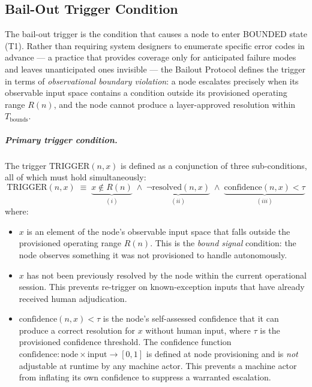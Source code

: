 \subsection{Bail-Out Trigger Condition}\label{sec:bailout-trigger}

The bail-out trigger is the condition that causes a node to enter BOUNDED state (T1). Rather than requiring system designers to enumerate specific error codes in advance — a practice that provides coverage only for anticipated failure modes and leaves unanticipated ones invisible — the Bailout Protocol defines the trigger in terms of \emph{observational boundary violation}: a node escalates precisely when its observable input space contains a condition outside its provisioned operating range $R(n)$, and the node cannot produce a \fact{} layer-approved resolution within $T_{\text{bounds}}$.

\subparagraph{Primary trigger condition.} The trigger $\text{TRIGGER}(n, x)$ is defined as a conjunction of three sub-conditions, all of which must hold simultaneously:
\begin{equation}
\text{TRIGGER}(n, x) \;\equiv\; \underbrace{x \notin R(n)}_{(i)} \;\land\; \underbrace{\neg\text{resolved}(n, x)}_{(ii)} \;\land\; \underbrace{\text{confidence}(n, x) < \tau}_{(iii)} \tag{TC}\label{eq:trigger-condition}
\end{equation}
where:

\begin{itemize}\itemsep0em
\item[(i)] $x$ is an element of the node's observable input space that falls outside the provisioned operating range $R(n)$. This is the \emph{bound signal} condition: the node observes something it was not provisioned to handle autonomously.
\item[(ii)] $x$ has not been previously resolved by the node within the current operational session. This prevents re-trigger on known-exception inputs that have already received human adjudication.
\item[(iii)] $\text{confidence}(n, x) < \tau$ is the node's self-assessed confidence that it can produce a correct resolution for $x$ without human input, where $\tau$ is the provisioned confidence threshold. The confidence function $\text{confidence} : \text{node} \times \text{input} \rightarrow [0, 1]$ is defined at node provisioning and is \emph{not} adjustable at runtime by any machine actor. This prevents a machine actor from inflating its own confidence to suppress a warranted escalation.
\end{itemize}

